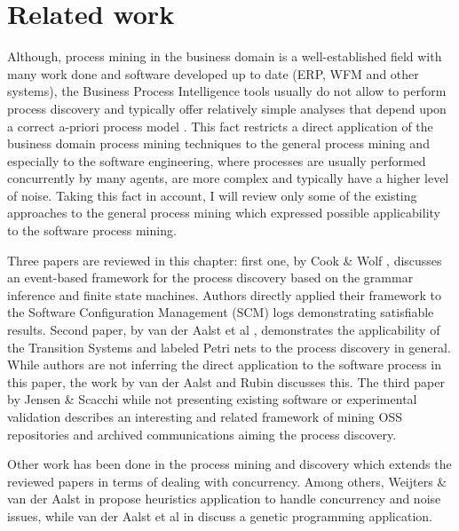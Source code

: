 \chapter{Related work}
Although, process mining in the business domain is a well-established field with many work done and software developed up to date (ERP, WFM and other systems), the Business Process Intelligence tools usually do not allow to perform process discovery and typically offer relatively simple analyses that depend upon a correct a-priori process model \cite{citeulike:3718014} \cite{citeulike:5044991}. This fact restricts a direct application of the business domain process mining techniques to the general process mining and especially to the software engineering, where processes are usually performed concurrently by many agents, are more complex and typically have a higher level of noise. Taking this fact in account, I will review only some of the existing approaches to the general process mining which expressed possible applicability to the software process mining. 

Three papers are reviewed in this chapter: first one, by Cook \& Wolf \cite{citeulike:328044}, discusses an event-based framework for the process discovery based on the grammar inference and finite state machines. Authors directly applied their framework to the Software Configuration Management (SCM) logs demonstrating satisfiable results. Second paper, by van der Aalst et al \cite{citeulike:3718014}, demonstrates the applicability of the Transition Systems and labeled Petri nets to the process discovery in general. While authors are not inferring the direct application to the software process in this paper, the work by van der Aalst and Rubin \cite{citeulike:1885717} discusses this. The third paper by Jensen \& Scacchi while not presenting existing software or experimental validation describes an interesting and related framework of mining OSS repositories and archived communications aiming the process discovery. 

Other work has been done in the process mining and discovery which extends the reviewed papers in terms of dealing with concurrency. Among others, Weijters \& van der Aalst in \cite{citeulike:5128101} propose heuristics application to handle concurrency and noise issues, while van der Aalst et al in \cite{citeulike:5128101} discuss a genetic programming application.